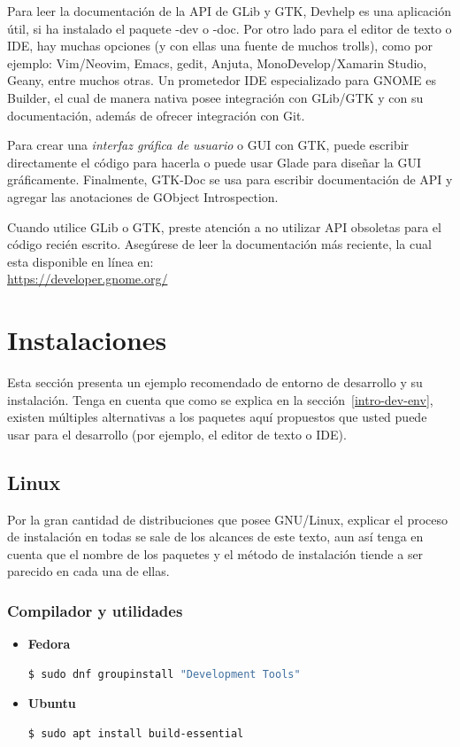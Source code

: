 Para leer la documentación de la API de GLib y GTK, Devhelp es una aplicación útil, si ha instalado el paquete -dev o -doc. Por otro lado para el editor de texto o IDE, hay muchas opciones (y con ellas una fuente de muchos trolls), como por ejemplo: Vim/Neovim, Emacs, gedit, Anjuta, MonoDevelop/Xamarin Studio, Geany, entre muchos otras. Un prometedor IDE especializado para GNOME es Builder, el cual de manera nativa posee integración con GLib/GTK y con su documentación, además de ofrecer integración con Git.

Para crear una \emph{interfaz gráfica de usuario} o GUI con GTK, puede escribir directamente el código para hacerla o puede usar Glade para diseñar la GUI gráficamente. Finalmente, GTK-Doc se usa para escribir documentación de API y agregar las anotaciones de GObject Introspection.

Cuando utilice GLib o GTK, preste atención a no utilizar API obsoletas para el código recién escrito. Asegúrese de leer la documentación más reciente, la cual esta disponible en línea en:\\

\url{https://developer.gnome.org/}


\section{Instalaciones}

Esta sección presenta un ejemplo recomendado de entorno de desarrollo y su instalación. Tenga en cuenta que como se explica en la sección~\ref{intro-dev-env}, existen múltiples alternativas a los paquetes aquí propuestos que usted puede usar para el desarrollo (por ejemplo, el editor de texto o IDE).


\subsection{Linux}

Por la gran cantidad de distribuciones que posee GNU/Linux, explicar el proceso de instalación en todas se sale de los alcances de este texto, aun así tenga en cuenta que el nombre de los paquetes y el método de instalación tiende a ser parecido en cada una de ellas.

\subsubsection{Compilador y utilidades}

\begin{itemize}
    \item \textbf{Fedora}
\begin{lstlisting}[language=bash]
$ sudo dnf groupinstall "Development Tools"
\end{lstlisting}

    \item \textbf{Ubuntu}
\begin{lstlisting}[language=bash]
$ sudo apt install build-essential
\end{lstlisting}
\end{itemize}


